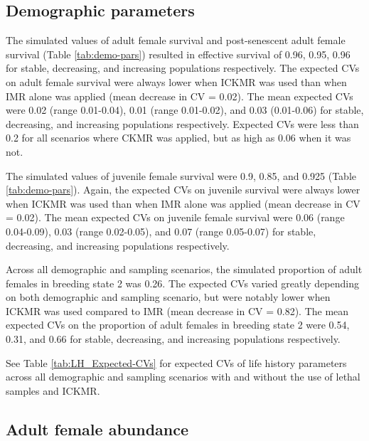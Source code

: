 
\subsection{Demographic parameters}

The simulated values of adult female survival and post-senescent adult
female survival (Table \ref{tab:demo-pars}) resulted in effective
survival of 0.96, 0.95, 0.96 for stable, decreasing, and increasing
populations respectively. The expected CVs on adult female survival
were always lower when ICKMR was used than when IMR alone was applied
(mean decrease in CV = 0.02). The mean expected CVs were 0.02 (range
0.01-0.04), 0.01 (range 0.01-0.02), and 0.03 (0.01-0.06) for stable,
decreasing, and increasing populations respectively. Expected CVs
were less than 0.2 for all scenarios where CKMR was applied, but as
high as 0.06 when it was not. 

The simulated values of juvenile female survival were 0.9, 0.85, and
0.925 (Table \ref{tab:demo-pars}). Again, the expected CVs on juvenile
survival were always lower when ICKMR was used than when IMR alone
was applied (mean decrease in CV = 0.02). The mean expected CVs on
juvenile female survival were 0.06 (range 0.04-0.09), 0.03 (range
0.02-0.05), and 0.07 (range 0.05-0.07) for stable, decreasing, and
increasing populations respectively.

Across all demographic and sampling scenarios, the simulated proportion
of adult females in breeding state 2 was 0.26. The expected CVs varied
greatly depending on both demographic and sampling scenario, but were
notably lower when ICKMR was used compared to IMR (mean decrease in
CV = 0.82). The mean expected CVs on the proportion of adult females
in breeding state 2 were 0.54, 0.31, and 0.66 for stable, decreasing,
and increasing populations respectively.

See Table \ref{tab:LH_Expected-CVs} for expected CVs of life history
parameters across all demographic and sampling scenarios with and
without the use of lethal samples and ICKMR.

\subsection{Adult female abundance}

